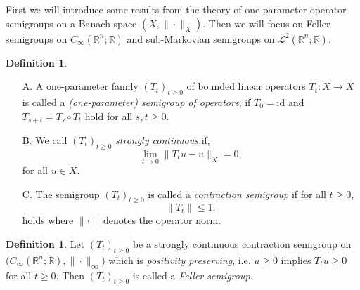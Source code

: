 \documentclass[a4paper, 12pt]{report}
\theoremstyle{remark}
\theoremstyle{definition}
\newtheorem{definition}[theorem]{Definition}
\begin{document}
First we will introduce some results from the theory of one-parameter operator semigroups on a Banach space $(X, \|\cdot\|_X)$.  Then we will focus on Feller semigroups on $C_\infty(\mathbb{R}^n; \mathbb{R})$ and sub-Markovian semigroups on $\mathcal{L}^2(\mathbb{R}^n; \mathbb{R})$.
\begin{definition}
\hspace{0.5cm}
\begin{itemize}
\item[A.] A one-parameter family $(T_t)_{t \ge 0}$ of bounded linear operators $T_t : X \to X$ is called a \emph{(one-parameter) semigroup of operators}, if $T_0 = \mathrm{id}$ and $T_{s + t} = T_s \circ T_t$ hold for all $s, t \ge 0$.

\item[B.] We call $(T_t)_{t \ge 0}$ \emph{strongly continuous} if,
\begin{equation}
\lim_{t \to 0}\|T_tu - u\|_X = 0,
\end{equation}
for all $u \in X$.

\item[C.] The semigroup $(T_t)_{t \ge 0}$ is called a \emph{contraction semigroup} if for all $t \ge 0$,
\begin{equation}
\|T_t\| \le 1,
\end{equation}
holds where $\|\cdot\|$ denotes the operator norm.
\end{itemize}
\end{definition}

\begin{definition}
Let $(T_t)_{t \ge 0}$ be a strongly continuous contraction semigroup on $\big(C_\infty(\mathbb{R}^n; \mathbb{R}), \|\cdot\|_\infty\big)$ which is \emph{positivity preserving}, i.e. $u \ge 0$ implies $T_tu \ge 0$ for all $t \ge 0$.  Then $(T_t)_{t \ge 0}$ is called a \emph{Feller semigroup}.
\end{definition}
\end{document}

